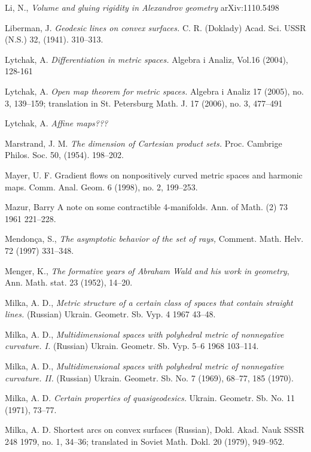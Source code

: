\begin{thebibliography}{52}
Li, N.,
\textit{Volume and gluing rigidity in Alexandrov geometry}
arXiv:1110.5498

Liberman, J. \textit{Geodesic lines on convex surfaces.}  C. R.
(Doklady) Acad. Sci. USSR (N.S.)  32,  (1941). 310--313.

Lytchak, A. \textit{Differentiation in metric spaces.}  Algebra i Analiz, Vol.16 (2004), 128-161 

Lytchak, A. \textit{Open map theorem for metric spaces.}  Algebra i Analiz  17  (2005),  no. 3, 139--159;  translation in  St. Petersburg Math. J.  17  (2006),  no. 3, 477--491 

 Lytchak, A. \textit{Affine maps???}

 Marstrand, J. M. \textit{The dimension of Cartesian product sets.}
Proc. Cambrige Philos. Soc. 50, (1954). 198--202.

 Mayer, U. F. Gradient flows on nonpositively curved metric spaces and harmonic maps. Comm. Anal. Geom. 6 (1998), no. 2, 199--253.

Mazur, Barry A note on some contractible 4-manifolds. Ann. of Math. (2) 73 1961 221--228. 

Mendon\c{c}a, S., \textit{The asymptotic behavior of the set of rays,} Comment. Math. Helv. 72 (1997) 331--348.


 Menger, K., \textit{The formative years of Abraham Wald and his work in geometry}, Ann. Math. stat. 23 (1952), 14--20.


Milka, A. D., \textit{Metric structure of a certain class of spaces that contain straight lines.} (Russian) Ukrain. Geometr. Sb. Vyp.  4  1967 43--48.

Milka, A. D., \textit{Multidimensional spaces with polyhedral metric of nonnegative curvature. I.}  (Russian)  Ukrain. Geometr. Sb. Vyp.  5--6 
1968 103--114. 

Milka, A. D., \textit{Multidimensional spaces with polyhedral metric of nonnegative curvature. II.}  (Russian)  Ukrain. Geometr. Sb. No. 7
(1969), 68--77, 185 (1970).

Milka, A. D. \textit{Certain properties of quasigeodesics.} 
Ukrain. Geometr. Sb. No. 11 (1971), 73--77.

 {Milka, A. D.} {Shortest arcs on convex surfaces} (Russian),  {Dokl. Akad.
Nauk SSSR}  {248}  {1979}, {no. 1}, {34--36};  translated in  Soviet Math. Dokl. 20 (1979), 949--952.


\end{thebibliography}
